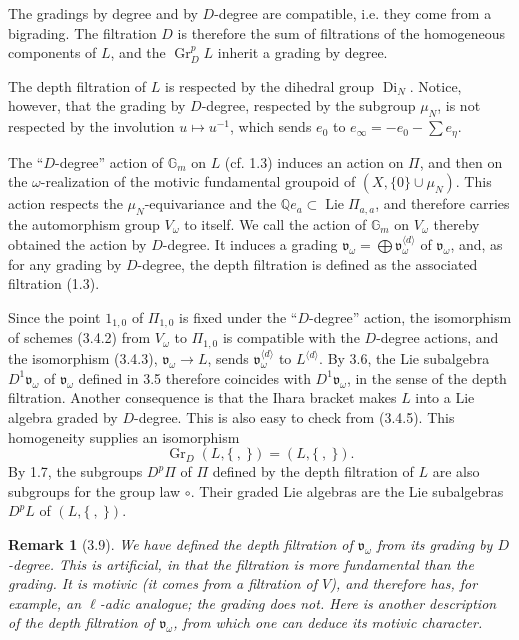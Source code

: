 \documentclass[10pt,a4paper]{article}
\newcommand{\Gm}{\mathbb G_m}
\newcommand{\muN}{\mu_N}
\newcommand{\Q}{\mathbb Q}
\newcommand{\Lie}{\operatorname{Lie}}
\newcommand{\Gr}{\operatorname{Gr}}
\newcommand{\vomega}{\mathfrak v_\omega}
\theoremstyle{deligne}
\newtheorem*{remark*}{Remark}
\newcommand{\heading}[1]{\vspace{0.65em}\noindent{\bfseries #1}\quad}
\begin{document}
The gradings by degree and by \(D\)-degree are compatible, i.e. they come from a bigrading. The filtration \(D\) is therefore the sum of filtrations of the homogeneous components of \(L\), and the \(\Gr_D^pL\) inherit a grading by degree.

The depth filtration of \(L\) is respected by the dihedral group \(\operatorname{Di}_N\). Notice, however, that the grading by \(D\)-degree, respected by the subgroup \(\muN\), is not respected by the involution \(u\mapsto u^{-1}\), which sends \(e_0\) to \(e_\infty=-e_0-\sum e_\eta\).

\heading{3.8.} The ``\(D\)-degree'' action of \(\Gm\) on \(L\) (cf. 1.3) induces an action on \(\Pi\), and then on the \(\omega\)-realization of the motivic fundamental groupoid of \((X,\{0\}\cup\muN)\). This action respects the \(\muN\)-equivariance and the \(\Q e_a\subset\Lie\Pi_{a,a}\), and therefore carries the automorphism group \(V_\omega\) to itself. We call the action of \(\Gm\) on \(V_\omega\) thereby obtained the action by \(D\)-degree. It induces a grading \(\vomega=\bigoplus\vomega^{\langle d\rangle}\) of \(\vomega\), and, as for any grading by \(D\)-degree, the depth filtration is defined as the associated filtration (1.3).

Since the point \(1_{1,0}\) of \(\Pi_{1,0}\) is fixed under the ``\(D\)-degree'' action, the isomorphism of schemes (3.4.2) from \(V_\omega\) to \(\Pi_{1,0}\) is compatible with the \(D\)-degree actions, and the isomorphism (3.4.3), \(\vomega\to L\), sends \(\vomega^{\langle d\rangle}\) to \(L^{\langle d\rangle}\). By 3.6, the Lie subalgebra \(D^1\vomega\) of \(\vomega\) defined in 3.5 therefore coincides with \(D^1\vomega\), in the sense of the depth filtration. Another consequence is that the Ihara bracket makes \(L\) into a Lie algebra graded by \(D\)-degree. This is also easy to check from (3.4.5). This homogeneity supplies an isomorphism
\[
\tag{3.8.1}
\Gr_D(L,\{\ ,\ \})=(L,\{\ ,\ \}).
\]
By 1.7, the subgroups \(D^p\Pi\) of \(\Pi\) defined by the depth filtration of \(L\) are also subgroups for the group law \(\circ\). Their graded Lie algebras are the Lie subalgebras \(D^pL\) of \((L,\{\ ,\ \})\).

\begin{remark*}[3.9]
We have defined the depth filtration of \(\vomega\) from its grading by \(D\)-degree. This is artificial, in that the filtration is more fundamental than the grading. It is motivic (it comes from a filtration of \(V\)), and therefore has, for example, an \(\ell\)-adic analogue; the grading does not. Here is another description of the depth filtration of \(\vomega\), from which one can deduce its motivic character.
\end{remark*}
\end{document}
